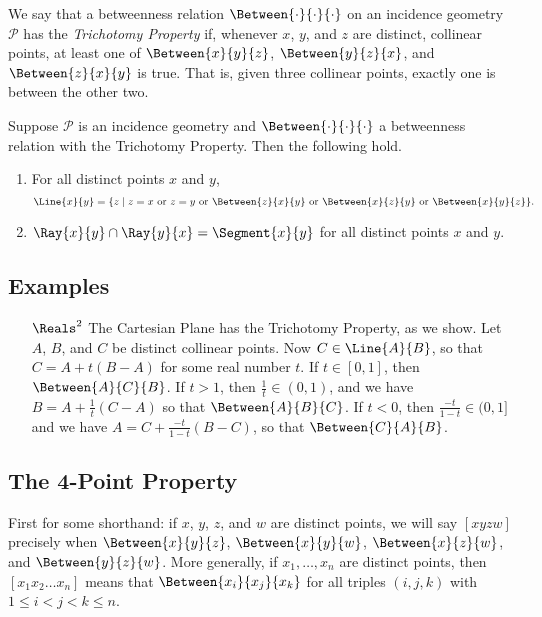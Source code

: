 \documentclass{article}
\begin{document}
\begin{dfn}
We say that a betweenness relation $\Between{\cdot}{\cdot}{\cdot}$ on an incidence geometry $\mathcal{P}$ has the \emph{Trichotomy Property} if, whenever $x$, $y$, and $z$ are distinct, collinear points, at least one of $\Between{x}{y}{z}$, $\Between{y}{z}{x}$, and $\Between{z}{x}{y}$ is true. That is, given three collinear points, exactly one is between the other two.
\end{dfn}

\begin{prop}
Suppose $\mathcal{P}$ is an incidence geometry and $\Between{\cdot}{\cdot}{\cdot}$ a betweenness relation with the Trichotomy Property. Then the following hold.
\begin{enumerate}
\item For all distinct points $x$ and $y$, \[ \Line{x}{y} = \{ z \mid z = x\ \mathrm{or}\ z = y\ \mathrm{or}\ \Between{z}{x}{y}\ \mathrm{or}\ \Between{x}{z}{y}\ \mathrm{or}\ \Between{x}{y}{z} \}. \]
\item $\Ray{x}{y} \cap \Ray{y}{x} = \Segment{x}{y}$ for all distinct points $x$ and $y$.
\end{enumerate}
\end{prop}

\subsection*{Examples}

\begin{itemize}
\item[$\Reals^2$] The Cartesian Plane has the Trichotomy Property, as we show. Let $A$, $B$, and $C$ be distinct collinear points. Now $C \in \Line{A}{B}$, so that $C = A + t(B-A)$ for some real number $t$. If $t \in [0,1]$, then $\Between{A}{C}{B}$. If $t > 1$, then $\frac{1}{t} \in (0,1)$, and we have $B = A + \frac{1}{t}(C-A)$ so that $\Between{A}{B}{C}$. If $t < 0$, then $\frac{-t}{1-t} \in (0,1]$ and we have $A = C + \frac{-t}{1-t}(B-C)$, so that $\Between{C}{A}{B}$.
\end{itemize}



\subsection*{The 4-Point Property}

First for some shorthand: if $x$, $y$, $z$, and $w$ are distinct points, we will say $[xyzw]$ precisely when $\Between{x}{y}{z}$, $\Between{x}{y}{w}$, $\Between{x}{z}{w}$, and $\Between{y}{z}{w}$. More generally, if $x_1, \ldots, x_n$ are distinct points, then $[x_1x_2 \ldots x_n]$ means that $\Between{x_i}{x_j}{x_k}$ for all triples $(i,j,k)$ with $1 \leq i < j < k \leq n$.
\end{document}
